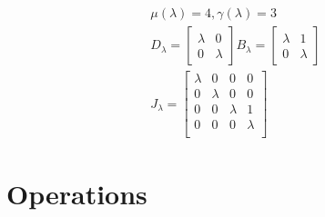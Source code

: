 \begin{example}
    \begin{gather*}
        \mu(\lambda) = 4, \gamma(\lambda) = 3 \\
        D_{\lambda} = \begin{bmatrix}
            \lambda & 0 \\  0 & \lambda
        \end{bmatrix}
        B_{\lambda} = \begin{bmatrix}
            \lambda & 1 \\ 0 & \lambda
        \end{bmatrix} \\
        J_{\lambda} = \begin{bmatrix}
            \lambda & 0       & 0       & 0       \\
            0       & \lambda & 0       & 0       \\
            0       & 0       & \lambda & 1       \\
            0       & 0       & 0       & \lambda \\
        \end{bmatrix}
    \end{gather*}
\end{example}
\section{Operations}
